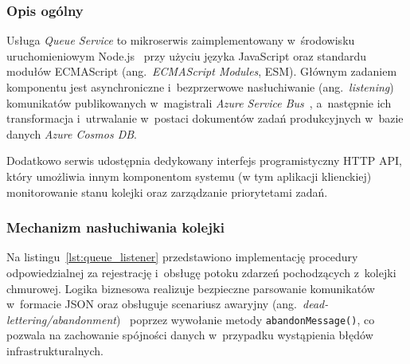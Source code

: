 \documentclass[a4paper,12pt,reqno]{article}
\begin{document}
\subsubsection{Opis ogólny}

Usługa \textit{Queue Service} to mikroserwis zaimplementowany w~środowisku uruchomieniowym Node.js~\cite{nodejs} przy użyciu języka JavaScript oraz standardu modułów ECMAScript (ang.~\textit{ECMAScript Modules}, ESM). Głównym zadaniem komponentu jest asynchroniczne i~bezprzerwowe nasłuchiwanie (ang.~\textit{listening}) komunikatów publikowanych w~magistrali \textit{Azure Service Bus}~\cite{richardson2020}, a~następnie ich transformacja i~utrwalanie w~postaci dokumentów zadań produkcyjnych w~bazie danych \textit{Azure Cosmos DB}.

Dodatkowo serwis udostępnia dedykowany interfejs programistyczny HTTP API, który umożliwia innym komponentom systemu (w tym aplikacji klienckiej) monitorowanie stanu kolejki oraz zarządzanie priorytetami zadań.

\subsubsection{Mechanizm nasłuchiwania kolejki}

Na listingu~\ref{lst:queue_listener} przedstawiono implementację procedury odpowiedzialnej za rejestrację i~obsługę potoku zdarzeń pochodzących z~kolejki chmurowej. Logika biznesowa realizuje bezpieczne parsowanie komunikatów w~formacie JSON oraz obsługuje scenariusz awaryjny (ang.~\textit{dead-lettering/abandonment})~\cite{richardson2020} poprzez wywołanie metody \texttt{abandonMessage()}, co pozwala na zachowanie spójności danych w~przypadku wystąpienia błędów infrastrukturalnych.
\end{document}

